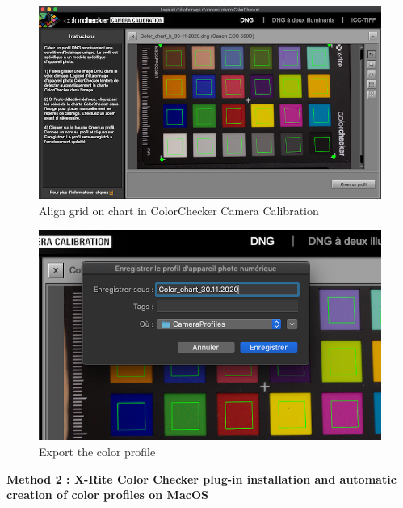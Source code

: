 \documentclass[
]{book}
\begin{document}
\begin{figure}

{\centering \includegraphics[width=0.8\linewidth]{Figures/ColorChecker_camera_calibration} 

}

\caption{Align grid on chart in ColorChecker Camera Calibration}\label{fig:Colorcheckercalibration}
\end{figure}

\begin{figure}

{\centering \includegraphics[width=0.8\linewidth]{Figures/create_profile} 

}

\caption{Export the color profile}\label{fig:ColorCheckerprofile}
\end{figure}

\textbf{Method 2 : X-Rite Color Checker plug-in installation and automatic
creation of color profiles on MacOS}
\end{document}
